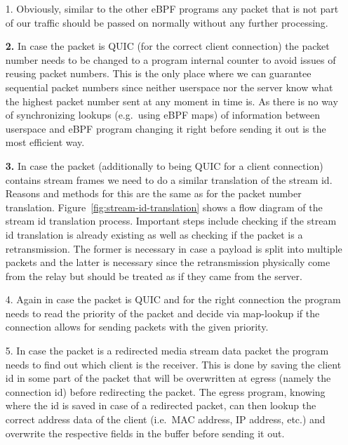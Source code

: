 \begin{enumerate}
    \item[1.]   Obviously, similar to the other eBPF programs any packet that is not part of our traffic 
            should be passed on normally without any further processing.
    \item[\textbf{2.}] In case the packet is QUIC (for the correct client connection) the packet number 
            needs to be changed to a program internal counter to avoid issues of reusing packet numbers. 
            This is the only place where we can guarantee sequential packet numbers since neither 
            userspace nor the server know what the highest packet number sent at any moment in time is. 
            As there is no way of synchronizing lookups (e.g.~using eBPF maps) of information between userspace 
            and eBPF program changing it right before sending it out is the most efficient way. 
    \item[\textbf{3.}] In case the packet (additionally to being QUIC for a client connection) contains 
                        stream frames we need to do a similar translation of the stream id.
                        Reasons and methods for this are the same as for the packet number translation.
                        Figure~\ref{fig:stream-id-translation} shows a flow diagram of the stream id translation
                        process.
                        Important steps include checking if the stream id translation is already existing as well
                        as checking if the packet is a retransmission.
                        The former is necessary in case a payload is split into multiple packets and the latter is 
                        necessary since the retransmission physically come from the relay but should be treated as 
                        if they came from the server.
    \item[4.] Again in case the packet is QUIC and for the right connection the program needs 
                        to read the priority of the packet and decide via map-lookup if the connection 
                        allows for sending packets with the given priority.
    \item[5.] In case the packet is a redirected media stream data packet the program needs to find out 
            which client is the receiver. 
            This is done by saving the client id in some part of the packet that will be overwritten 
            at egress (namely the connection id) before redirecting the packet.
            The egress program, knowing where the id is saved in case of a redirected packet, can then
            lookup the correct address data of the client (i.e.~MAC address, IP address, etc.) and
            overwrite the respective fields in the buffer before sending it out.
\end{enumerate}

